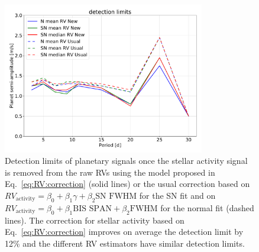 \documentclass{aa}
\newcommand{\jessi}[1]{{\color{Purple}[[\textbf{Jessi: }#1]]}}
\begin{document}
\begin{figure}[!h]
\begin{center}
\includegraphics[height = 2.6in]{detection_limits.pdf} 
   \caption{Detection limits of planetary signals once the stellar activity signal is removed from the raw RVs using the model proposed in Eq.~\eqref{eq:RV:correction} (solid lines) or the usual correction based on $RV_{\text{activity}}=\beta_0+\beta_1 \gamma + \beta_2 \text{SN FWHM}$ for the SN fit and on $RV_{\text{activity}}=\beta_0+\beta_1 \text{BIS SPAN} + \beta_2 \text{FWHM}$ for the normal fit (dashed lines). The correction for stellar activity based on Eq.~\eqref{eq:RV:correction} improves on average the detection limit by 12\% and the different RV estimators have similar detection limits.}
   \label{fig:detection_limits}
\end{center}
\end{figure}

%

\end{document}
